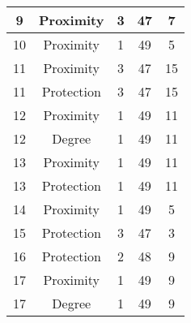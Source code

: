 \documentclass[results.tex]{subfiles}
\begin{document}
\begin{center}
\begin{tabular}{| c || c | c | c | c |}
            \hline
            9                       & Proximity                    & 3                      & 47                      & 7                    \\
            \hline
            10                      & Proximity                    & 1                      & 49                      & 5                    \\
            \hline
            11                      & Proximity                    & 3                      & 47                      & 15                   \\
            \hline
            11                      & Protection                   & 3                      & 47                      & 15                   \\
            \hline
            12                      & Proximity                    & 1                      & 49                      & 11                   \\
            \hline
            12                      & Degree                       & 1                      & 49                      & 11                   \\
            \hline
            13                      & Proximity                    & 1                      & 49                      & 11                   \\
            \hline
            13                      & Protection                   & 1                      & 49                      & 11                   \\
            \hline
            14                      & Proximity                    & 1                      & 49                      & 5                    \\
            \hline
            15                      & Protection                   & 3                      & 47                      & 3                    \\
            \hline
            16                      & Protection                   & 2                      & 48                      & 9                    \\
            \hline
            17                      & Proximity                    & 1                      & 49                      & 9                    \\
            \hline
            17                      & Degree                       & 1                      & 49                      & 9                    \\

\end{tabular}
\end{center}
\end{document}
